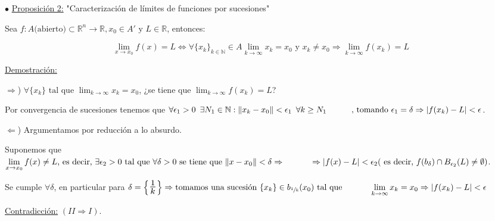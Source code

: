 \documentclass[10pt, titlepage]{article}
\newcommand{\R}{\mathbb{R}}
\newcommand{\N}{\mathbb{N}}
\newcommand{\bfrac}[2]{\scalebox{1.4}{$\frac{#1}{#2}$}}
\newcommand{\spac}{\, \, \,}
\newcommand{\proposicion}[1][\!\!]{\noindent$\bullet$ \underline{Proposición #1:} }
\newcommand{\dindent}{\indent\indent}
\begin{document}

{\color{red}\proposicion[2] "Caracterización de límites de funciones por  sucesiones"}
\vspace{3mm}

Sea $f : A \text{(abierto)} \subset \R^n \to \R, x_0 \in A' \text{ y } L \in \R$, entonces:

\[
\boxed{
\displaystyle \lim_{x \to x_0}^{} f (x) = L \iff \forall \{x_k\}_{k \in \N} \in A \lim_{k \to \infty} x_k = x_0 \text{ y } x_k \neq x_0 \Rightarrow \lim_{k \to \infty} f (x_k) = L
}
\]
\vspace{3mm}

\underline{Demostración:}
\vspace{3mm}

\dindent $\Rightarrow$) $\forall \{x_k\} \text{ tal que } \displaystyle \lim_{k \to \infty} x_k = x_0$, ¿se tiene 
que $\displaystyle \lim_{k \to \infty} f (x_k) = L$?
\vspace{3mm}

\dindent Por convergencia de sucesiones tenemos 	que $\forall{\epsilon_1 > 0} \spac \exists{N_1 \in \N} : 
\|x_k - x_0\| < \epsilon_1 \spac \forall{k \geq N_1} \\ \dindent\text{, tomando } \epsilon_1 = \delta 
\Rightarrow |f (x_k) - L| < \epsilon$.
\vspace{3mm}

\dindent $\Leftarrow$) Argumentamos por reducción a lo absurdo. 
\vspace{3mm}

\dindent Suponemos que $\displaystyle \lim_{x \to x_0} f (x) \neq L \text{, es decir, } \exists{\epsilon_2 > 0} \text{ tal que } \forall{\delta > 0} \text{  se tiene que } \|x - x_0\| < \delta \Rightarrow \\ \dindent 
\Rightarrow|f (x) - L| < \epsilon_2 \text{( es decir, } f (b_\delta) \cap B_{\epsilon_2} (L) \neq \emptyset)$.
\vspace{3mm}

\dindent Se cumple $\forall \delta$, en particular para $\delta = \left \{ \bfrac{1}{k} \right \} \Rightarrow 
\text{tomamos una sucesión } \{x_k\} \in b_{\sfrac{1}{k}} (x_0) \text{ tal que } \\ \dindent \displaystyle 
 \lim_{k \to \infty} x_k = x_0 \Rightarrow |f (x_k) - L| < \epsilon$
\vspace{3mm}

\dindent \underline{Contradicción:} $(II \Rightarrow I)$.
\vspace{5mm}
\end{document}
